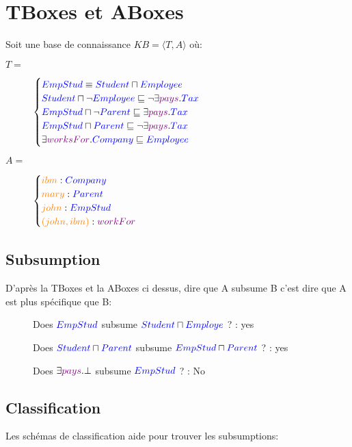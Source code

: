 \section{TBoxes et ABoxes}
Soit une base de connaissance $KB = \langle T,A \rangle$ où:
\begin{description}
\item[$T = $] 
$\begin{cases}
\textcolor{blue}{EmpStud} \equiv \textcolor{blue}{Student} \sqcap \textcolor{blue}{Employee} \\
\textcolor{blue}{Student} \sqcap \neg \textcolor{blue}{Employee} \sqsubseteq \neg \exists  \textcolor{violet}{pays}.\textcolor{blue}{Tax} \\
\textcolor{blue}{EmpStud} \sqcap \neg \textcolor{blue}{Parent} \sqsubseteq \exists  \textcolor{violet}{pays}.\textcolor{blue}{Tax} \\
\textcolor{blue}{EmpStud} \sqcap \textcolor{blue}{Parent} \sqsubseteq \neg \exists \textcolor{violet}{pays}.\textcolor{blue}{Tax} \\
\exists \textcolor{violet}{worksFor}.\textcolor{blue}{Company} \sqsubseteq \textcolor{blue}{Employee}
\end{cases}$
\item[$A = $]
$\begin{cases}
\textcolor{orange}{ibm}: \textcolor{blue}{Company} \\
\textcolor{orange}{mary} : \textcolor{blue}{Parent} \\
\textcolor{orange}{john}: \textcolor{blue}{EmpStud} \\
\textcolor{orange}{(john,ibm)}:\textcolor{violet}{workFor} \\
\end{cases}$
\end{description}

\subsection{Subsumption}
D'après la TBoxes et la ABoxes ci dessus, dire que A subsume B c'est dire que A est plus spécifique que B:
\begin{description}
\item[] Does $\textcolor{blue}{EmpStud}$ subsume $\textcolor{blue}{Student} \sqcap \textcolor{blue}{Employe}$ ? : yes
\item[] Does $\textcolor{blue}{Student} \sqcap \textcolor{blue}{Parent}$ subsume $\textcolor{blue}{EmpStud} \sqcap \textcolor{blue}{Parent}$ ? : yes
\item[] Does $\exists \textcolor{violet}{pays}.\bot$ subsume $\textcolor{blue}{EmpStud}$ ? : No
\end{description}

\subsection{Classification}
Les schémas de classification aide pour trouver les subsumptions:

